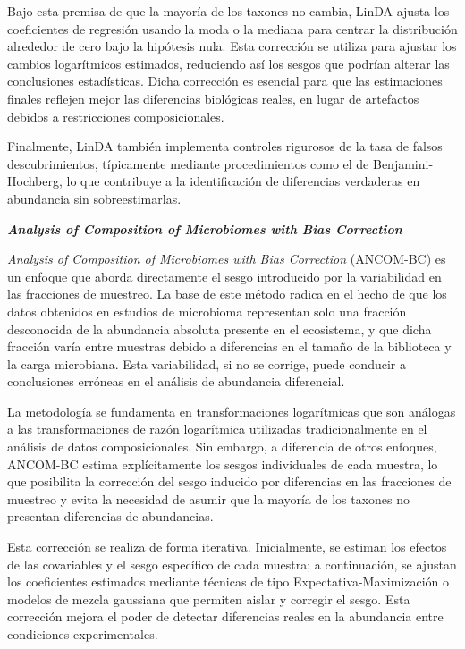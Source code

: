Bajo esta premisa de que la mayoría de los taxones no cambia, LinDA ajusta los coeficientes de regresión usando la moda o la mediana para centrar la distribución alrededor de cero bajo la hipótesis nula. Esta corrección se utiliza para ajustar los cambios logarítmicos estimados, reduciendo así los sesgos que podrían alterar las conclusiones estadísticas. Dicha corrección es esencial para que las estimaciones finales reflejen mejor las diferencias biológicas reales, en lugar de artefactos debidos a restricciones composicionales.

Finalmente, LinDA también implementa controles rigurosos de la tasa de falsos descubrimientos, típicamente mediante procedimientos como el de Benjamini-Hochberg, lo que contribuye a la identificación de diferencias verdaderas en abundancia sin sobreestimarlas.

\textbf{\textit{Analysis of Composition of Microbiomes with Bias Correction}}

\textit{Analysis of Composition of Microbiomes with Bias Correction} (ANCOM-BC) \cite{lin2020analysis} es un enfoque que aborda directamente el sesgo introducido por la variabilidad en las fracciones de muestreo. La base de este método radica en el hecho de que los datos obtenidos en estudios de microbioma representan solo una fracción desconocida de la abundancia absoluta presente en el ecosistema, y que dicha fracción varía entre muestras debido a diferencias en el tamaño de la biblioteca y la carga microbiana. Esta variabilidad, si no se corrige, puede conducir a conclusiones erróneas en el análisis de abundancia diferencial.

La metodología se fundamenta en transformaciones logarítmicas que son análogas a las transformaciones de razón logarítmica utilizadas tradicionalmente en el análisis de datos composicionales. Sin embargo, a diferencia de otros enfoques, ANCOM-BC estima explícitamente los sesgos individuales de cada muestra, lo que posibilita la corrección del sesgo inducido por diferencias en las fracciones de muestreo y evita la necesidad de asumir que la mayoría de los taxones no presentan diferencias de abundancias.

Esta corrección se realiza de forma iterativa. Inicialmente, se estiman los efectos de las covariables y el sesgo específico de cada muestra; a continuación, se ajustan los coeficientes estimados mediante técnicas de tipo Expectativa-Maximización o modelos de mezcla gaussiana que permiten aislar y corregir el sesgo. Esta corrección mejora el poder de detectar diferencias reales en la abundancia entre condiciones experimentales.



